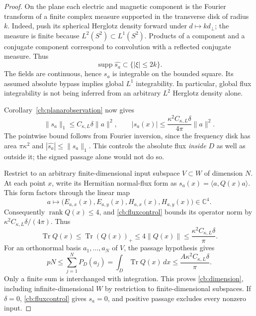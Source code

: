 \begin{proof}
On the plane each electric and magnetic component is the Fourier transform
of a finite complex measure supported in the transverse disk of radius $k$.
Indeed, push its spherical Herglotz density forward under
$d\mapsto kd_\perp$; the measure is finite because $L^2(S^2)\subset L^1(S^2)$.
Products of a component and a conjugate component correspond to convolution
with a reflected conjugate measure. Thus
\begin{equation}
 \operatorname{supp}\widehat{s_a}\subset\{|\xi|\leq2k\}.
 \label{cb:fluxbandwidth}
\end{equation}
The fields are continuous, hence $s_a$ is integrable on the bounded square.
Its assumed absolute bypass implies global $L^1$ integrability. In particular,
global flux integrability is not being inferred from an arbitrary
$L^2$ Herglotz density alone.

Corollary~\ref{cb:planarobservation} now gives
\begin{equation}
 \|s_a\|_1\leq C_{\kappa,L}\delta\|a\|^2,\qquad
 |s_a(x)|\leq\frac{\kappa^2 C_{\kappa,L}\delta}{4\pi}\|a\|^2.
 \label{cb:fluxcontrol}
\end{equation}
The pointwise bound follows from Fourier inversion, since the frequency
disk has area $\pi\kappa^2$ and $|\widehat{s_a}|\leq\|s_a\|_1$.
This controls the absolute flux \emph{inside} $D$ as well as outside it;
the signed passage alone would not do so.

Restrict to an arbitrary finite-dimensional input subspace $V\subset W$
of dimension $N$. At each point $x$, write its Hermitian normal-flux form
as $s_a(x)=\langle a,Q(x)a\rangle$. This form factors through the linear map
\begin{equation}
 a\longmapsto\bigl(E_{a,x}(x),E_{a,y}(x),H_{a,x}(x),H_{a,y}(x)\bigr)
       \in\mathbb C^4.
 \label{cb:pointmap}
\end{equation}
Consequently $\operatorname{rank}Q(x)\leq4$, and
\eqref{cb:fluxcontrol} bounds its operator norm by
$\kappa^2 C_{\kappa,L}\delta/(4\pi)$. Thus
\begin{equation}
 \operatorname{Tr}Q(x)\leq\operatorname{Tr}(Q(x))_+
       \leq4\|Q(x)\|
       \leq\frac{\kappa^2 C_{\kappa,L}\delta}{\pi}.
 \label{cb:pointtrace}
\end{equation}
For an orthonormal basis $a_1,\ldots,a_N$ of $V$, the passage hypothesis gives
\begin{equation}
 pN\leq\sum_{j=1}^NP_D(a_j)
    =\int_D\operatorname{Tr}Q(x)\,dx
    \leq\frac{A\kappa^2 C_{\kappa,L}\delta}{\pi}.
 \label{cb:integratedtrace}
\end{equation}
Only a finite sum is interchanged with integration. This proves
\eqref{cb:dimension}, including infinite-dimensional $W$ by restriction
to finite-dimensional subspaces.
If $\delta=0$, \eqref{cb:fluxcontrol} gives $s_a=0$, and positive passage
excludes every nonzero input.
\end{proof}

